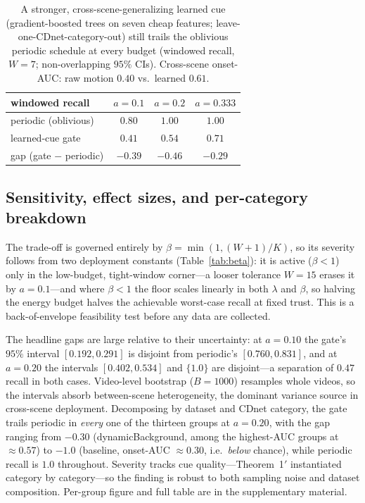 ﻿\documentclass[lettersize,journal]{IEEEtran}
\begin{document}
\begin{table}[!tb]\centering\caption{A stronger, cross-scene-generalizing learned cue (gradient-boosted trees on seven cheap features; leave-one-CDnet-category-out) still trails the oblivious periodic schedule at every budget (windowed recall, $W{=}7$; non-overlapping $95\%$ CIs). Cross-scene onset-AUC: raw motion $0.40$ vs.\ learned $0.61$.}\label{tab:learned}
\small
\begin{tabular}{lccc}
\toprule
windowed recall & $a{=}0.1$ & $a{=}0.2$ & $a{=}0.333$\\
\midrule
periodic (oblivious) & $0.80$ & $1.00$ & $1.00$\\
learned-cue gate & $0.41$ & $0.54$ & $0.71$\\
gap (gate $-$ periodic) & $-0.39$ & $-0.46$ & $-0.29$\\
\bottomrule
\end{tabular}
\end{table}

\subsection{Sensitivity, effect sizes, and per-category breakdown}
The trade-off is governed entirely by $\beta=\min(1,(W{+}1)/K)$, so its severity follows from two deployment constants (Table~\ref{tab:beta}): it is active ($\beta<1$) only in the low-budget, tight-window corner---a looser tolerance $W{=}15$ erases it by $a{=}0.1$---and where $\beta<1$ the floor scales linearly in both $\lambda$ and $\beta$, so halving the energy budget halves the achievable worst-case recall at fixed trust. This is a back-of-envelope feasibility test before any data are collected.

The headline gaps are large relative to their uncertainty: at $a{=}0.10$ the gate's $95\%$ interval $[0.192,0.291]$ is disjoint from periodic's $[0.760,0.831]$, and at $a{=}0.20$ the intervals $[0.402,0.534]$ and $\{1.0\}$ are disjoint---a separation of $0.47$ recall in both cases. Video-level bootstrap ($B{=}1000$) resamples whole videos, so the intervals absorb between-scene heterogeneity, the dominant variance source in cross-scene deployment. Decomposing by dataset and CDnet category, the gate trails periodic in \emph{every} one of the thirteen groups at $a{=}0.20$, with the gap ranging from $-0.30$ (dynamicBackground, among the highest-AUC groups at $\approx0.57$) to $-1.0$ (baseline, onset-AUC $\approx0.30$, i.e.\ \emph{below} chance), while periodic recall is $1.0$ throughout. Severity tracks cue quality---Theorem~1$'$ instantiated category by category---so the finding is robust to both sampling noise and dataset composition. Per-group figure and full table are in the supplementary material.
\end{document}
